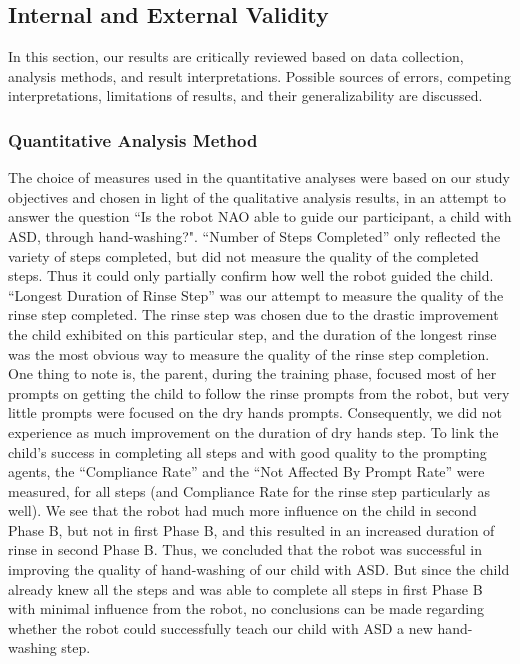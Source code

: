 \subsection{Internal and External Validity}
In this section, our results are critically reviewed based on data collection, analysis methods, and result interpretations.  Possible sources of errors, competing interpretations, limitations of results, and their generalizability are discussed.

\subsubsection{Quantitative Analysis Method}
The choice of measures used in the quantitative analyses were based on our study objectives and chosen in light of the qualitative analysis results, in an attempt to answer the question ``Is the robot NAO able to guide our participant, a child with ASD, through hand-washing?".  ``Number of Steps Completed'' only reflected the variety of steps completed, but did not measure the quality of the completed steps.  Thus it could only partially confirm how well the robot guided the child.  ``Longest Duration of Rinse Step'' was our attempt to measure the quality of the rinse step completed.  The rinse step was chosen due to the drastic improvement the child exhibited on this particular step, and the duration of the longest rinse was the most obvious way to measure the quality of the rinse step completion.  One thing to note is, the parent, during the training phase, focused most of her prompts on getting the child to follow the rinse prompts from the robot, but very little prompts were focused on the dry hands prompts.  Consequently, we did not experience as much improvement on the duration of dry hands step.  To link the child's success in completing all steps and with good quality to the prompting agents, the ``Compliance Rate'' and the ``Not Affected By Prompt Rate'' were measured, for all steps (and Compliance Rate for the rinse step particularly as well).  We see that the robot had much more influence on the child in second Phase B, but not in first Phase B, and this resulted in an increased duration of rinse in second Phase B.  Thus, we concluded that the robot was successful in improving the quality of hand-washing of our child with ASD.  But since the child already knew all the steps and was able to complete all steps in first Phase B with minimal influence from the robot, no conclusions can be made regarding whether the robot could successfully teach our child with ASD a new hand-washing step.

